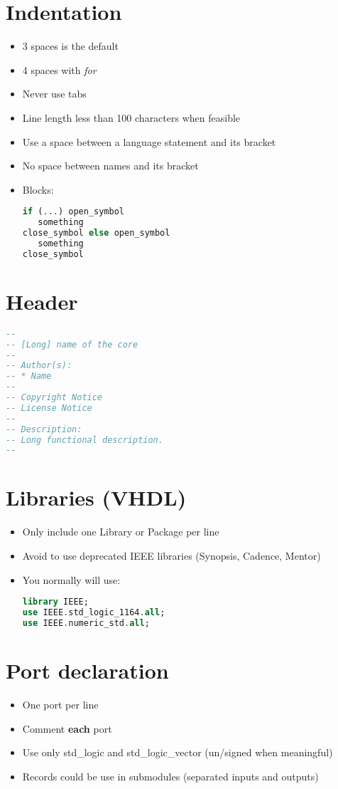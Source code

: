 \documentclass{article}
\begin{document}
\begin{multicols}{3}
  \section*{Indentation}
    \begin{itemize}
      \item 3 spaces is the default
      \item 4 spaces with \textit{for}
      \item Never use tabs
      \item Line length less than 100 characters when feasible
      \item Use a space between a language statement and its bracket
      \item No space between names and its bracket
      \item Blocks:
        \begin{lstlisting}[language=vhdl]
if (...) open_symbol
   something
close_symbol else open_symbol
   something
close_symbol
        \end{lstlisting}
    \end{itemize}
  \section*{Header}
    \begin{lstlisting}[language=vhdl]
--
-- [Long] name of the core
--
-- Author(s):
-- * Name
--
-- Copyright Notice
-- License Notice
--
-- Description:
-- Long functional description.
--
    \end{lstlisting}
  \section*{Libraries (VHDL)}
    \begin{itemize}
      \item Only include one Library or Package per line
      \item Avoid to use deprecated IEEE libraries (Synopsis, Cadence, Mentor)
      \item You normally will use:
        \begin{lstlisting}[language=vhdl]
library IEEE;
use IEEE.std_logic_1164.all;
use IEEE.numeric_std.all;
        \end{lstlisting}
    \end{itemize}
  \section*{Port declaration}
    \begin{itemize}
      \item One port per line
      \item Comment \textbf{each} port
      \item Use only std\_logic and std\_logic\_vector (un/signed when meaningful)
      \item Records could be use in submodules (separated inputs and outputs)
    \end{itemize}

\end{multicols}
\end{document}
